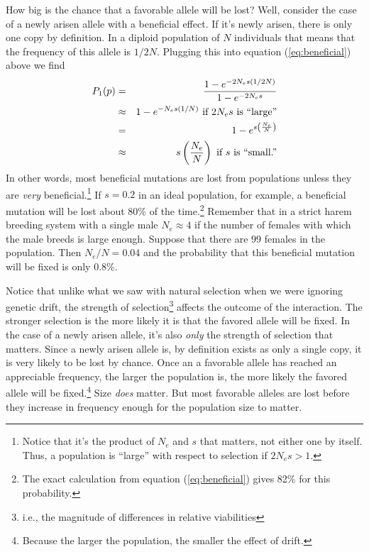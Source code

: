 \documentclass[12pt]{article}
\begin{document}
How big is the chance that a favorable allele will be
lost? Well, consider the
case of a newly arisen allele with a beneficial effect. If it's newly
arisen, there is only one copy by definition. In a diploid population
of $N$ individuals that means that the frequency of this allele is
$1/2N$. Plugging this into equation (\ref{eq:beneficial}) above we
find
\begin{eqnarray*}
P_1(p) &=& \frac{1 - e^{-2N_es(1/2N)}}{1 - e^{-2N_es}} \\
       &\approx& 1 - e^{-N_es(1/N)} \hbox{ if $2N_es$ is ``large''} \\
       &=& 1 - e^{s\left(\frac{N_e}{N}\right)} \\
       &\approx& s\left(\frac{N_e}{N}\right)
                 \hbox{ if $s$ is ``small.''}
\end{eqnarray*}
In other words, most beneficial mutations are lost from populations
unless they are {\it very\/} beneficial.\footnote{Notice that it's the
  product of $N_e$ and $s$ that matters, not either one by
  itself. Thus, a population is ``large'' with respect to selection if
  $2N_es > 1$.} If $s=0.2$ in an ideal population, for example, a
beneficial mutation will be lost about 80\% of the time.\footnote{The
  exact calculation from equation (\ref{eq:beneficial}) gives 82\% for
  this probability.} Remember that in a strict harem breeding system
with a single male $N_e \approx 4$ if the number of females with which
the male breeds is large enough. Suppose that there are 99 females in
the population. Then $N_e/N = 0.04$ and the probability that this
beneficial mutation will be fixed is only 0.8\%.

Notice that unlike what we saw with natural selection when we were
ignoring genetic drift, the strength of selection\footnote{i.e., the
  magnitude of differences in relative viabilities} affects the
outcome of the interaction. The stronger selection is the more likely
it is that the favored allele will be fixed. In the case of a newly
arisen allele, it's also {\it only\/} the strength of selection that
matters. Since a newly arisen allele is, by definition exists as only
a single copy, it is very likely to be lost by chance. Once an a
favorable allele has reached an appreciable frequency, the larger the
population is, the more likely the favored allele will be
fixed.\footnote{Because the larger the population, the smaller the
  effect of drift.} Size {\it does\/} matter. But most favorable
alleles are lost before they increase in frequency enough for the
population size to matter.
\end{document}
